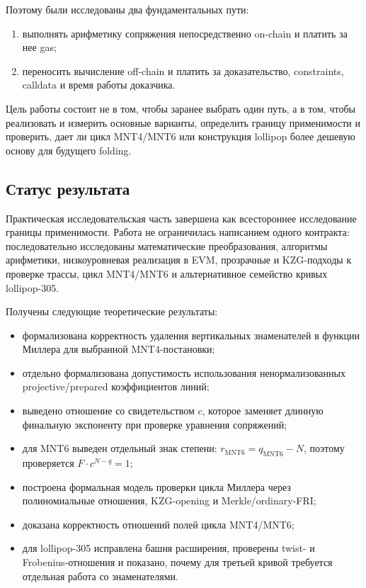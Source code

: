 \documentclass[12pt,a4paper]{article}
\begin{document}
Поэтому были исследованы два фундаментальных пути:
\begin{enumerate}
    \item выполнять арифметику сопряжения непосредственно on-chain и платить
    за нее gas;
    \item переносить вычисление off-chain и платить за доказательство,
    constraints, calldata и время работы доказчика.
\end{enumerate}

Цель работы состоит не в том, чтобы заранее выбрать один путь, а в том, чтобы
реализовать и измерить основные варианты, определить границу применимости и
проверить, дает ли цикл MNT4/MNT6 или конструкция lollipop более дешевую основу
для будущего folding.

\subsection{Статус результата}

Практическая исследовательская часть завершена как всестороннее исследование
границы применимости. Работа не ограничилась написанием одного контракта:
последовательно исследованы математические преобразования, алгоритмы
арифметики, низкоуровневая реализация в EVM, прозрачные и KZG-подходы к
проверке трассы, цикл MNT4/MNT6 и альтернативное семейство кривых
lollipop-305.

Получены следующие теоретические результаты:
\begin{itemize}
    \item формализована корректность удаления вертикальных знаменателей
    в функции Миллера для выбранной MNT4-постановки;
    \item отдельно формализована допустимость использования ненормализованных
    projective/prepared коэффициентов линий;
    \item выведено отношение со свидетельством $c$, которое заменяет длинную
    финальную экспоненту при проверке уравнения сопряжений;
    \item для MNT6 выведен отдельный знак степени:
    $r_{\mathrm{MNT6}}=q_{\mathrm{MNT6}}-N$, поэтому проверяется
    $F\cdot c^{N-q}=1$;
    \item построена формальная модель проверки цикла Миллера через
    полиномиальные отношения, KZG-opening и Merkle/ordinary-FRI;
    \item доказана корректность отношений полей цикла MNT4/MNT6;
    \item для lollipop-305 исправлена башня расширения, проверены twist- и
    Frobenius-отношения и показано, почему для третьей кривой требуется
    отдельная работа со знаменателями.
\end{itemize}
\end{document}
